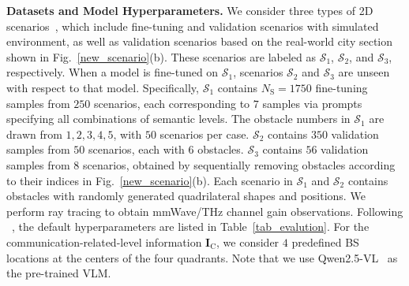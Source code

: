 \documentclass[journal,10pt,twocolumn]{IEEEtran}
\newcommand\SC{\ensuremath{\mathcal{S}}}
\newcommand\FIF{\ensuremath{\mathbf{I}}}
\newcommand\CR{\ensuremath{\mathrm{C}}}
\newcommand\SR{\ensuremath{\mathrm{S}}}
\begin{document}
{\bf Datasets and Model Hyperparameters.} We consider three types of 2D scenarios~\cite{hu2025advancing}, which include fine-tuning and validation scenarios with simulated environment, as well as validation scenarios based on the real-world city section shown in Fig.~\ref{new_scenario}(b). These scenarios are labeled as \( \SC_1 \), \( \SC_2 \), and \( \SC_3 \), respectively. When a model is fine-tuned on \( \SC_1 \), scenarios \( \SC_2 \) and \( \SC_3 \) are unseen with respect to that model. Specifically, $\SC_1$ contains $N_{\SR}=1750$ fine-tuning samples from $250$ scenarios, each corresponding to $7$ samples via prompts specifying all combinations of semantic levels. The obstacle numbers in $\SC_1$ are drawn from ${1,2,3,4,5}$, with $50$ scenarios per case. $\SC_2$ contains $350$ validation samples from $50$ scenarios, each with $6$ obstacles. $\SC_3$ contains $56$ validation samples from $8$ scenarios, obtained by sequentially removing obstacles according to their indices in Fig.~\ref{new_scenario}(b). Each scenario in \( \SC_1\) and \( \SC_2\) contains obstacles with randomly generated quadrilateral shapes and positions. We perform ray tracing to obtain mmWave/THz channel gain observations. Following ~\cite{hu2025advancing}, the default hyperparameters are listed in Table~\ref{tab_evalution}. For the communication-related-level information $\FIF_{\CR}$, we consider $4$ predefined BS locations at the centers of the four quadrants. Note that we use Qwen2.5-VL~\cite{bai2025qwen2} as the pre-trained VLM.
\end{document}
